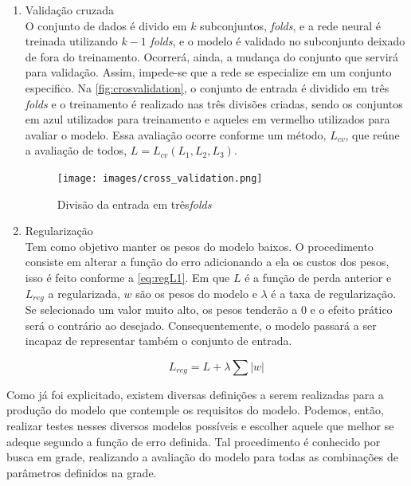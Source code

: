 \documentclass[
    12pt,
    oneside,
    a4paper,
    english,
    brazil
]{abntex2}
\begin{document}
\begin{enumerate}
    \item Validação cruzada\\
        O conjunto de dados é divido em $k$ subconjuntos, \textit{folds}, e a rede
        neural é treinada  utilizando $k-1$ \textit{folds}, e o modelo é 
        validado  no subconjunto deixado de  fora do  treinamento.  
        Ocorrerá,  ainda, a  mudança  do conjunto  que
        servirá para validação. Assim, impede-se que a rede se especialize em
        um conjunto  especifico. Na \autoref{fig:crosvalidation}, o conjunto de
        entrada é dividido  em três \textit{folds} e o  treinamento é realizado
        nas três divisões  criadas, sendo os conjuntos em  azul utilizados para
        treinamento e aqueles em vermelho utilizados para avaliar o modelo. Essa
        avaliação ocorre  conforme  um  método, $L_{cv}$,  que  reúne  a
        avaliação de todos, $L = L_{cv}(L_1, L_2, L_3)$.

        \begin{figure}[ht]
            \centering
            \caption{Divisão da entrada em três\textit{folds}}\label{fig:crosvalidation}
            \texttt{[image: images/cross\_validation.png]}
        \end{figure}

    \item Regularização\\
        Tem  como objetivo  manter os  pesos do  modelo baixos.  O procedimento
        consiste  em alterar  a função  do erro  adicionando a  ela os custos dos
        pesos, isso é  feito conforme a \autoref{eq:regL1}. Em que $L$ é a função
        de perda anterior e $L_{reg}$ a  regularizada, $w$ são os pesos do modelo
        e $\lambda$  é a taxa de  regularização. Se selecionado um  valor muito
        alto, os pesos tenderão a  $0$ e o efeito  prático será o  contrário ao
        desejado. Consequentemente, o modelo passará  a ser  incapaz de  
        representar também  o conjunto de entrada.

        \begin{equation}\label{eq:regL1}
            L_{reg} = L + \lambda \sum{|w|}
        \end{equation}
\end{enumerate}

Como  já  foi explicitado,  existem  diversas definições  a  serem  realizadas  para
a produção  do  modelo que  contemple  os  requisitos  do modelo.  Podemos, então,
realizar testes nesses diversos modelos  possíveis e escolher aquele que melhor
se adeque segundo a função de  erro definida. Tal procedimento é conhecido por
busca em grade,  realizando a avaliação do modelo para  todas as combinações de
parâmetros definidos na grade.
\end{document}
